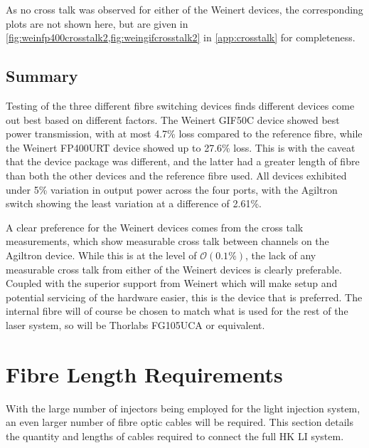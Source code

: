 \documentclass[a4paper,11pt]{article}
\begin{document}
As no cross talk was observed for either of the Weinert devices, the corresponding plots are not shown here, but are given in \cref{fig:weinfp400crosstalk2,fig:weingifcrosstalk2} in \cref{app:crosstalk} for completeness.

\subsection{Summary}
Testing of the three different fibre switching devices finds different devices come out best based on different factors. The Weinert GIF50C device showed best power transmission, with at most 4.7\% loss compared to the reference fibre, while the Weinert FP400URT device showed up to 27.6\% loss. This is with the caveat that the device package was different, and the latter had a greater length of fibre than both the other devices and the reference fibre used. All devices exhibited under 5\% variation in output power across the four ports, with the Agiltron switch showing the least variation at a difference of 2.61\%.

A clear preference for the Weinert devices comes from the cross talk measurements, which show measurable cross talk between channels on the Agiltron device. While this is at the level of $\mathcal{O}(0.1\%)$, the lack of any measurable cross talk from either of the Weinert devices is clearly preferable. Coupled with the superior support from Weinert which will make setup and potential servicing of the hardware easier, this is the device that is preferred. The internal fibre will of course be chosen to match what is used for the rest of the laser system, so will be Thorlabs FG105UCA or equivalent.


\section{Fibre Length Requirements}\label{sec:lengths}

With the large number of injectors being employed for the light injection system, an even larger number of fibre optic cables will be required. This section details the quantity and lengths of cables required to connect the full HK LI system.
\end{document}
